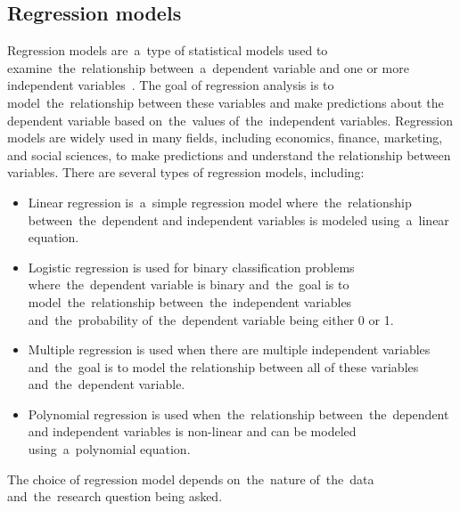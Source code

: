 \subsection{Regression models}\label{sec:regression}
Regression models are~a~type of statistical models used to examine~the~relationship between~a~dependent variable
and one or more independent variables~\cite{Fahrmeir}.
The goal of regression analysis is to model~the~relationship between these variables and make predictions about
the dependent variable based on~the~values of~the~independent variables. Regression models are widely used in many
fields, including economics, finance, marketing, and social sciences, to make predictions and understand the
relationship between variables. There are several types of regression models, including:
\begin{itemize}
    \item Linear regression is~a~simple regression model where~the~relationship between~the~dependent and independent
    variables is modeled using~a~linear equation.
    \item Logistic regression is used for binary classification problems where~the~dependent variable is binary and~the~goal is to model~the~relationship between~the~independent variables and~the~probability of~the~dependent
    variable being either 0 or 1.
    \item Multiple regression is used when there are multiple independent variables and~the~goal is to model the
    relationship between all of these variables and~the~dependent variable.
    \item Polynomial regression is used when~the~relationship between~the~dependent and independent variables
    is non-linear and can be modeled using~a~polynomial equation.
\end{itemize}

The choice of regression model depends on~the~nature of~the~data and~the~research question being asked.

